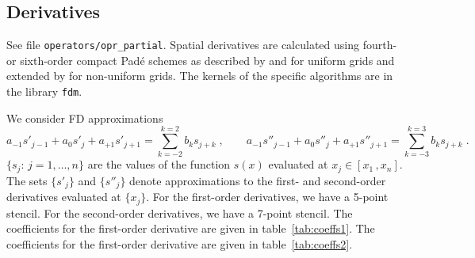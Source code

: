 \subsection{Derivatives}\label{sec:fdm}

See file {\tt operators/opr\_partial}. Spatial derivatives are calculated using fourth- or sixth-order compact Pad\'{e} schemes as described by \cite{Lele:1992} and \cite{Lamballais:2011} for uniform grids and extended by \cite{Shukla:2005} for non-uniform grids. The kernels of the specific algorithms are in the library {\tt fdm}.

We consider FD approximations
\begin{equation}
  a_{-1}s'_{j-1}+a_{0}s'_{j}+a_{+1}s'_{j+1}=\sum_{k=-2}^{k=2}b_ks_{j+k} \;,\qquad
  a_{-1}s''_{j-1}+a_{0}s''_{j}+a_{+1}s''_{j+1}=\sum_{k=-3}^{k=3}b_ks_{j+k} \;.
  \label{equ:coefs}
\end{equation}
$\{s_j:\, j=1,\ldots,n\}$ are the values of the function $s(x)$ evaluated at $x_j\in[x_1\,,x_n]$. The sets $\{s'_j\}$ and $\{s''_j\}$ denote approximations to the first- and second-order derivatives evaluated at $\{x_j\}$. For the first-order derivatives, we have a 5-point stencil. For the second-order derivatives, we have a 7-point stencil.
The coefficients for the first-order derivative are given in table~\ref{tab:coeffs1}. The coefficients for the first-order derivative are given in table~\ref{tab:coeffs2}.

